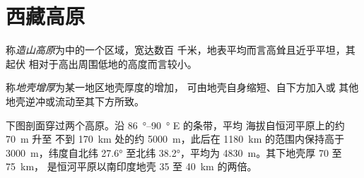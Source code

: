 \section{西藏高原}\label{sec:b2:himalaya-andes:tibet}

\begin{definition}[造山高原]\label{def:b2:himalaya-andes:plateau}
称\emph{造山高原}为中的一个区域，宽达数百
千米，地表平均而言高耸且近乎平坦，其起伏
相对于高出周围低地的高度而言较小。
\end{definition}

\begin{definition}[地壳增厚]\label{def:b2:himalaya-andes:thickening}
称\emph{地壳增厚}为某一地区地壳厚度的增加，
可由地壳自身缩短、自下方加入或
其他地壳逆冲或流动至其下方所致。
\end{definition}

下图剖面穿过两个高原。沿 \qtyrange{86}{90}{\degree} E 的条带，平均
海拔自恒河平原上的约 \qty{70}{m} 升至
不到 \qty{170}{km} 处的约 \qty{5000}{m}，此后在 \qty{1180}{km} 的范围内保持高于 \qty{3000}{m}，纬度自北纬 \ang{27.6}
至北纬 \ang{38.2}，平均为 \qty{4830}{m}。其下地壳厚 70 至 \qty{75}{km}，
是恒河平原以南印度地壳 35 至 \qty{40}{km} 的两倍。

